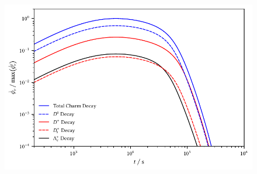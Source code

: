 \begin{figure}[H]
	\centering
	\includegraphics{../plots/build/magnetar_charm_decay_comparison_with.pdf}
	\caption[]{}
	\label{fig:magnetar-charm-comparison-with}
\end{figure}
